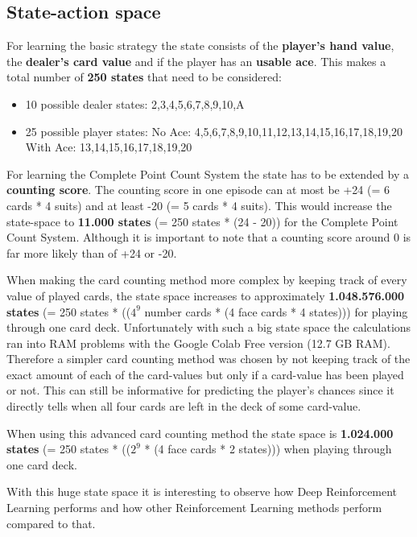 \documentclass[conference]{IEEEtran}
\begin{document}
\subsection{State-action space}
For learning the basic strategy the state consists of the \textbf{player's hand value}, the \textbf{dealer's card value} and if the player has an \textbf{usable ace}. 
This makes a total number of \textbf{250 states} that need to be considered:
\begin{itemize}
	\item 10 possible dealer states: 2,3,4,5,6,7,8,9,10,A
	\item 25 possible player states:
		\subitem No Ace: 4,5,6,7,8,9,10,11,12,13,14,15,16,17,18,19,20
		\subitem With Ace: 13,14,15,16,17,18,19,20
\end{itemize}

For learning the Complete Point Count System the state has to be extended by a \textbf{counting score}.
The counting score in one episode can at most be +24 (= 6 cards * 4 suits) and at least -20 (= 5 cards * 4 suits).
This would increase the state-space to \textbf{11.000 states} (= 250 states * (24 - 20)) for the Complete Point Count System. 
Although it is important to note that a counting score around 0 is far more likely than of +24 or -20.

When making the card counting method more complex by keeping track of every value of played cards, the state space increases to approximately \textbf{1.048.576.000 states} (= 250 states * (($4^9$ number cards * (4 face cards * 4 states))) for playing through one card deck. 
Unfortunately with such a big state space the calculations ran into RAM problems with the Google Colab Free version (12.7 GB RAM).
Therefore a simpler card counting method was chosen by not keeping track of the exact amount of each of the card-values but only if a card-value has been played or not. 
This can still be informative for predicting the player's chances since it directly tells when all four cards are left in the deck of some card-value.

When using this advanced card counting method the state space is \textbf{1.024.000 states} (= 250 states * (($2^9$ * (4 face cards * 2 states))) when playing through one card deck.

With this huge state space it is interesting to observe how Deep Reinforcement Learning performs and how other Reinforcement Learning methods perform compared to that. 
\end{document}
